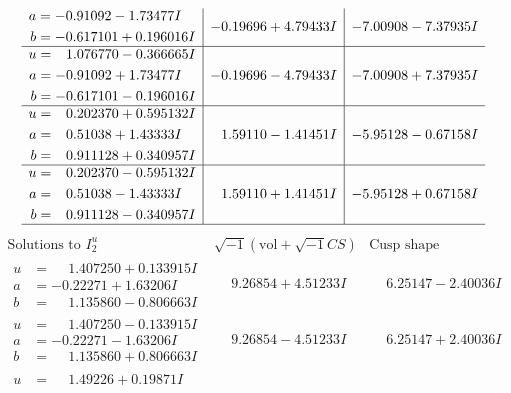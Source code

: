 \documentclass[1p]{elsarticle_modified}
\theoremstyle{definition}
\newcommand{\I}{\sqrt{-1}}
\begin{document}
$$\begin{array}{c|c|c}
\begin{aligned}
a &= -0.91092 - 1.73477 I \\
b &= -0.617101 + 0.196016 I\end{aligned}
 & -0.19696 + 4.79433 I & -7.00908 - 7.37935 I \\ \hline\begin{aligned}
u &= \phantom{-}1.076770 - 0.366665 I \\
a &= -0.91092 + 1.73477 I \\
b &= -0.617101 - 0.196016 I\end{aligned}
 & -0.19696 - 4.79433 I & -7.00908 + 7.37935 I \\ \hline\begin{aligned}
u &= \phantom{-}0.202370 + 0.595132 I \\
a &= \phantom{-}0.51038 + 1.43333 I \\
b &= \phantom{-}0.911128 + 0.340957 I\end{aligned}
 & \phantom{-}1.59110 - 1.41451 I & -5.95128 - 0.67158 I \\ \hline\begin{aligned}
u &= \phantom{-}0.202370 - 0.595132 I \\
a &= \phantom{-}0.51038 - 1.43333 I \\
b &= \phantom{-}0.911128 - 0.340957 I\end{aligned}
 & \phantom{-}1.59110 + 1.41451 I & -5.95128 + 0.67158 I\\
 \hline 
 \end{array}$$\newpage$$\begin{array}{c|c|c}  
\text{Solutions to }I^u_{2}& \I (\text{vol} + \sqrt{-1}CS) & \text{Cusp shape}\\
 \hline 
\begin{aligned}
u &= \phantom{-}1.407250 + 0.133915 I \\
a &= -0.22271 + 1.63206 I \\
b &= \phantom{-}1.135860 - 0.806663 I\end{aligned}
 & \phantom{-}9.26854 + 4.51233 I & \phantom{-}6.25147 - 2.40036 I \\ \hline\begin{aligned}
u &= \phantom{-}1.407250 - 0.133915 I \\
a &= -0.22271 - 1.63206 I \\
b &= \phantom{-}1.135860 + 0.806663 I\end{aligned}
 & \phantom{-}9.26854 - 4.51233 I & \phantom{-}6.25147 + 2.40036 I \\ \hline\begin{aligned}
u &= \phantom{-}1.49226 + 0.19871 I \\

\end{aligned}
\end{array}$$
\end{document}
